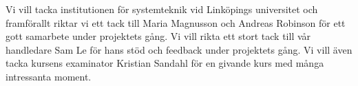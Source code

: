 Vi vill tacka institutionen för systemteknik vid Linköpings universitet och framförallt riktar vi ett tack till Maria Magnusson och Andreas Robinson för ett gott samarbete under projektets gång. Vi vill rikta ett stort tack till vår handledare Sam Le för hans stöd och feedback under projektets gång. Vi vill även tacka kursens examinator Kristian Sandahl för en givande kurs med många intressanta moment.

\cleardoublepage
